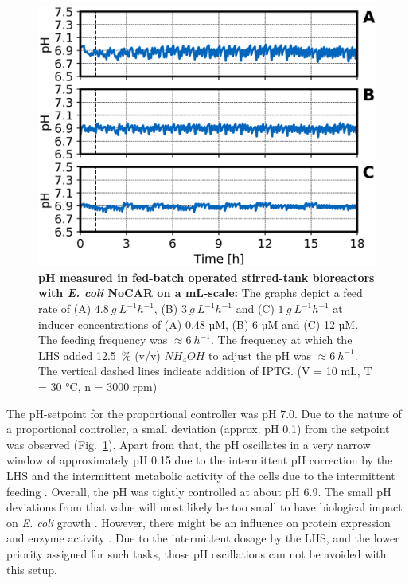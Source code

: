 \documentclass[sn-standardnature]{sn-jnl}%
\theoremstyle{thmstyleone}%
\theoremstyle{thmstyletwo}%
\theoremstyle{thmstylethree}%
\begin{document}
\begin{figure}[H]
    \centering
    \includegraphics[width=1.0\textwidth]{figures/pH_overview.png}
    \caption{
        \textbf{pH measured in fed-batch operated stirred-tank bioreactors with \textit{E. coli} NoCAR on a mL-scale:}
        The graphs depict a feed rate of (A) $4.8\ g\ L^{-1} h^{-1}$, (B) $3\ g\ L^{-1} h^{-1}$ and (C) $1\ g\ L^{-1} h^{-1}$ at inducer concentrations of (A) 0.48 µM, (B) 6 µM and (C) 12 µM.
        The feeding frequency was $\approx 6\ h^{-1}$.
        The frequency at which the LHS added 12.5~\% (v/v) $NH_{4}OH$ to adjust the pH was $\approx 6\ h^{-1}$.
        The vertical dashed lines indicate addition of IPTG.
        (V = 10 mL, T = 30 °C, n = 3000 rpm)
    }
    \label{fig_pHoverview}
\end{figure}

The pH-setpoint for the proportional controller was pH 7.0.
Due to the nature of a proportional controller, a small deviation (approx. pH 0.1) from the setpoint was observed (Fig.~\ref{fig_pHoverview}).
Apart from that, the pH oscillates in a very narrow window of approximately pH 0.15 due to the intermittent pH correction by the LHS and the intermittent metabolic activity of the cells due to the intermittent feeding \cite{kim2004high}.
Overall, the pH was tightly controlled at about pH 6.9.
The small pH deviations from that value will most likely be too small to have biological impact on \textit{E. coli} growth \cite{presser1997modelling,gale1942effect}.
However, there might be an influence on protein expression and enzyme activity \cite{cui2009influence,strandberg1991factors}.
Due to the intermittent dosage by the LHS, and the lower priority assigned for such tasks, those pH oscillations can not be avoided with this setup.
\end{document}
